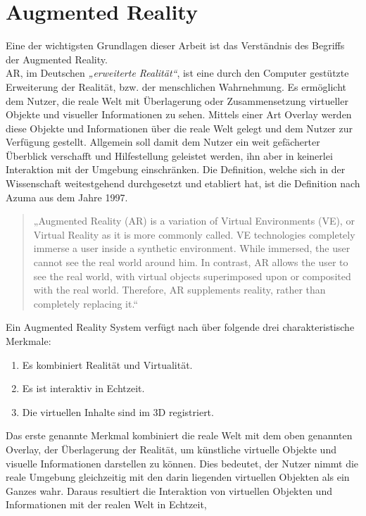 \section{Augmented Reality}
\label{chap:Augmented Reality}
Eine der wichtigsten Grundlagen dieser Arbeit ist das Verständnis des Begriffs der Augmented Reality.
\\ 
\acl{AR}, im Deutschen \textit{„erweiterte Realität“}, ist eine durch den Computer gestützte Erweiterung der Realität, bzw. der menschlichen 
Wahrnehmung. Es ermöglicht dem Nutzer, die reale Welt mit Überlagerung oder Zusammensetzung virtueller Objekte und visueller Informationen
zu sehen. Mittels einer Art Overlay werden diese Objekte und Informationen über die reale Welt gelegt und dem Nutzer zur Verfügung gestellt. 
Allgemein soll damit dem Nutzer ein weit gefächerter Überblick verschafft und Hilfestellung geleistet werden, ihn aber in keinerlei 
Interaktion mit der Umgebung einschränken. Die Definition, welche sich in der Wissenschaft weitestgehend durchgesetzt und etabliert hat, ist 
die Definition nach Azuma aus dem Jahre 1997.
\begin{quote}
    „Augmented Reality (AR) is a variation of Virtual Environments (VE), or Virtual Reality as it is more commonly called. VE 
    technologies completely immerse a user inside a synthetic environment. While immersed, the user cannot see the real world around him. 
    In contrast, AR allows the user to see the real world, with virtual objects superimposed upon or composited with the real world. 
    Therefore, AR supplements reality, rather than completely replacing it.“ \cite{azuma.1997a}
\end{quote}
Ein Augmented Reality System verfügt nach \cite{azuma.1997a} über folgende drei charakteristische Merkmale: 
\begin{enumerate}
    \item Es kombiniert Realität und Virtualität.
    \item Es ist interaktiv in Echtzeit.
    \item Die virtuellen Inhalte sind im 3D registriert.
\end{enumerate}
Das erste genannte Merkmal kombiniert die reale Welt mit dem oben genannten Overlay, der Überlagerung der Realität, um künstliche virtuelle 
Objekte und visuelle Informationen darstellen zu können. Dies bedeutet, der Nutzer nimmt die reale Umgebung gleichzeitig mit den darin liegenden virtuellen 
Objekten als ein Ganzes wahr. Daraus resultiert die Interaktion von virtuellen Objekten und Informationen mit der realen Welt in Echtzeit, 

